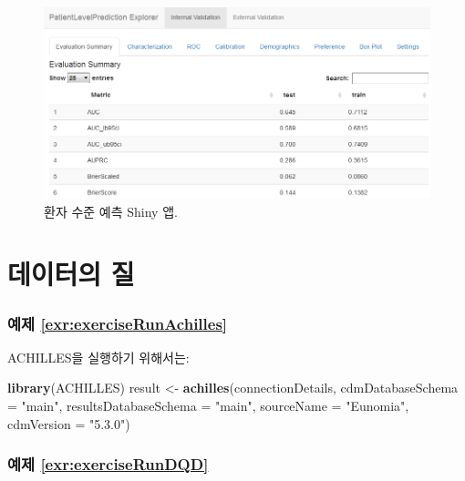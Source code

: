 \documentclass[10.5pt]{book}
\newenvironment{Shaded}{\begin{snugshade}}{\end{snugshade}}
\newcommand{\KeywordTok}[1]{\textcolor[rgb]{0.13,0.29,0.53}{\textbf{#1}}}
\newcommand{\DataTypeTok}[1]{\textcolor[rgb]{0.13,0.29,0.53}{#1}}
\newcommand{\StringTok}[1]{\textcolor[rgb]{0.31,0.60,0.02}{#1}}
\newcommand{\NormalTok}[1]{#1}
\theoremstyle{definition}
\theoremstyle{definition}
\theoremstyle{definition}
\theoremstyle{remark}
\begin{document}
\begin{figure}

{\centering \includegraphics[width=1\linewidth]{images/SuggestedAnswers/plpShiny} 

}

\caption{환자 수준 예측 Shiny 앱.}\label{fig:plpShiny}
\end{figure}

\section{데이터의 질}\label{DataQualityanswers}

\subsubsection*{예제
\ref{exr:exerciseRunAchilles}}\label{-refexrexerciserunachilles}

ACHILLES을 실행하기 위해서는:

\begin{Shaded}
\begin{Highlighting}[]
\KeywordTok{library}\NormalTok{(ACHILLES)}
\NormalTok{result <-}\StringTok{ }\KeywordTok{achilles}\NormalTok{(connectionDetails,}
                   \DataTypeTok{cdmDatabaseSchema =} \StringTok{"main"}\NormalTok{,}
                   \DataTypeTok{resultsDatabaseSchema =} \StringTok{"main"}\NormalTok{,}
                   \DataTypeTok{sourceName =} \StringTok{"Eunomia"}\NormalTok{,}
                   \DataTypeTok{cdmVersion =} \StringTok{"5.3.0"}\NormalTok{)}
\end{Highlighting}
\end{Shaded}

\subsubsection*{예제
\ref{exr:exerciseRunDQD}}\label{-refexrexerciserundqd}
\end{document}
